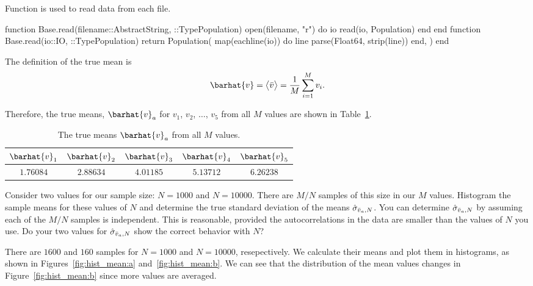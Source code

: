 \begin{algorithm}
    \caption{Function  is used to read data from each file.}
    \label{lst:readdata}
    \begin{juliacode}
        function Base.read(filename::AbstractString, ::Type{Population})
            open(filename, "r") do io
                read(io, Population)
            end
        end
        function Base.read(io::IO, ::Type{Population})
            return Population(
                map(eachline(io)) do line
                    parse(Float64, strip(line))
                end,
            )
        end
    \end{juliacode}
\end{algorithm}

The definition of the true mean is
\begin{equation}
    \barhat{v} = \bigl \langle \bar{v} \bigr \rangle = \frac{ 1 }{ M } \sum_{i=1}^{M} v_i.
\end{equation}

Therefore, the true means, \(\barhat{v}_a\) for \(v_1\), \(v_2\), \(\ldots\), \(v_5\) from
all \(M\) values are shown in Table~\ref{tab:truemean}.

\begin{table}[hb]
    \centering
    \caption{The true means \(\barhat{v}_a\) from all \(M\) values.}
    \label{tab:truemean}
    \begin{tabular}{@{}ccccc@{}}
        \toprule
        \(\barhat{v}_1\) & \(\barhat{v}_2\) & \(\barhat{v}_3\) & \(\barhat{v}_4\) & \(\barhat{v}_5\) \\
        \midrule
        \(1.76084\)      & \(2.88634\)      & \(4.01185\)      & \(5.13712\)      & \(6.26238\)      \\
        \bottomrule
    \end{tabular}
\end{table}


\Question{} Consider two values for our sample size: \(N = 1000\) and \(N = 10000\). There are
\(M/N\) samples of this size in our \(M\) values. Histogram the sample means for these values of
\(N\) and determine the true standard deviation of the means \(\hat{\sigma}_{\bar{v}_a,N}\).
You can determine \(\hat{\sigma}_{\bar{v}_a,N}\) by assuming each of the \(M/N\) samples is
independent. This is reasonable, provided the autocorrelations in the data are smaller than
the values of \(N\) you use. Do your two values for \(\hat{\sigma}_{\bar{v}_a,N}\) show the
correct behavior with \(N\)?

\Answer{}
There are \(1600\) and \(160\) samples for \(N = 1000\) and \(N = 10000\), resepectively.
We calculate their means and plot them in histograms, as shown in
Figures~\ref{fig:hist_mean:a} and~\ref{fig:hist_mean:b}.
We can see that the distribution of the mean values changes in Figure~\ref{fig:hist_mean:b}
since more values are averaged.

